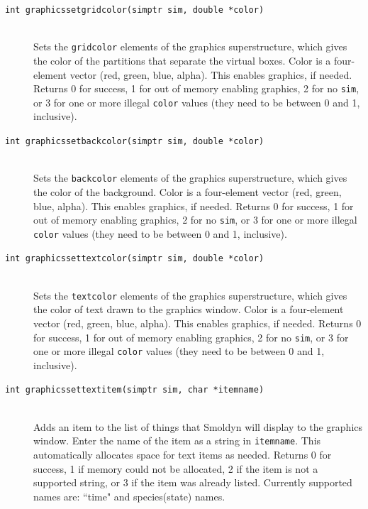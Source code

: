 \documentclass {scrbook}
\newcommand {\ttt} {\texttt}
\begin{document}
\begin{description}
\item[\ttt{int graphicssetgridcolor(simptr sim, double *color)}]
\hfill \\
Sets the \ttt{gridcolor} elements of the graphics superstructure, which gives the color of the partitions that separate the virtual boxes. Color is a four-element vector (red, green, blue, alpha). This enables graphics, if needed. Returns 0 for success, 1 for out of memory enabling graphics, 2 for no \ttt{sim}, or 3 for one or more illegal \ttt{color} values (they need to be between 0 and 1, inclusive).

\item[\ttt{int graphicssetbackcolor(simptr sim, double *color)}]
\hfill \\
Sets the \ttt{backcolor} elements of the graphics superstructure, which gives the color of the background. Color is a four-element vector (red, green, blue, alpha). This enables graphics, if needed. Returns 0 for success, 1 for out of memory enabling graphics, 2 for no \ttt{sim}, or 3 for one or more illegal \ttt{color} values (they need to be between 0 and 1, inclusive).

\item[\ttt{int graphicssettextcolor(simptr sim, double *color)}]
\hfill \\
Sets the \ttt{textcolor} elements of the graphics superstructure, which gives the color of text drawn to the graphics window. Color is a four-element vector (red, green, blue, alpha). This enables graphics, if needed. Returns 0 for success, 1 for out of memory enabling graphics, 2 for no \ttt{sim}, or 3 for one or more illegal \ttt{color} values (they need to be between 0 and 1, inclusive).

\item[\ttt{int graphicssettextitem(simptr sim, char *itemname)}]
\hfill \\
Adds an item to the list of things that Smoldyn will display to the graphics window. Enter the name of the item as a string in \ttt{itemname}. This automatically allocates space for text items as needed. Returns 0 for success, 1 if memory could not be allocated, 2 if the item is not a supported string, or 3 if the item was already listed. Currently supported names are: ``time" and species(state) names.


\end{description}
\end{document}
